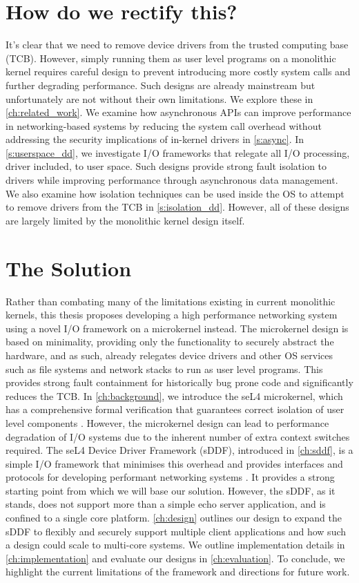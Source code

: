\section{How do we rectify this?}
It's clear that we need to remove device drivers from the trusted computing base (TCB). However, simply 
running them as user level programs on a monolithic kernel requires careful design to prevent introducing
more costly system calls and further degrading performance. Such designs are already mainstream but unfortunately
are not without their own limitations. We explore these in \autoref{ch:related_work}. We examine how
asynchronous APIs can improve
performance in networking-based systems by reducing the system call overhead without addressing the security
implications of in-kernel drivers in \autoref{s:async}. In \autoref{s:userspace_dd}, we investigate I/O frameworks
that relegate all I/O processing, driver included, to user space. Such designs provide strong fault isolation to
drivers while improving performance through asynchronous data management. 
We also examine how isolation techniques can be used inside the OS to attempt to remove
drivers from the TCB in \autoref{s:isolation_dd}.
However, all of these designs are largely limited by the monolithic kernel design itself.

\section{The Solution}
Rather than combating many of the limitations existing in current monolithic kernels,
this thesis proposes developing a high performance networking system using a novel I/O framework on
a microkernel instead. The microkernel design is based on minimality, providing only the functionality to
securely abstract the hardware, and as such, already relegates device drivers and
other OS services such as file systems and network stacks to run as user level programs. This provides
strong fault containment for historically bug prone code and significantly reduces the TCB.
In \autoref{ch:background}, we introduce the seL4 microkernel, which has a comprehensive formal verification
that guarantees correct isolation of user level components \cite{Klein_AEMSKH_14}.
However, the microkernel design can lead to performance
degradation of I/O systems due to the inherent number of extra context switches required. The seL4 Device Driver
Framework (sDDF), introduced in \autoref{ch:sddf}, is a simple I/O framework that minimises this overhead
and provides interfaces and protocols for developing performant networking systems \cite{Parker_22:sddf}. It provides
a strong starting point from which we will base our solution.
However, the sDDF, as it stands, does not support more than a simple echo server application, and is confined 
to a single core platform. \autoref{ch:design} outlines our design to expand the sDDF to flexibly and securely 
support multiple client applications and how such a design could scale to multi-core systems. We outline implementation
details in \autoref{ch:implementation} and evaluate our designs in \autoref{ch:evaluation}. To conclude, we highlight
the current limitations of the framework and directions for future work. 

